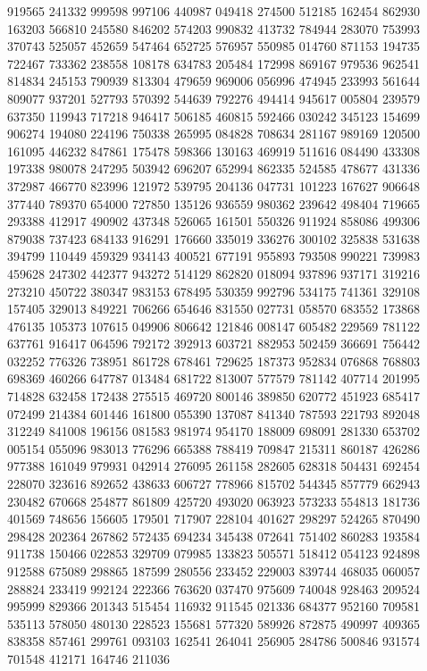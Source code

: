 {919565 241332 999598 997106 440987 049418 274500 512185 162454 862930 163203%
566810 245580 846202 574203 990832 413732 784944 283070 753993 370743 525057%
452659 547464 652725 576957 550985 014760 871153 194735 722467 733362 238558%
108178 634783 205484 172998 869167 979536 962541 814834 245153 790939 813304%
479659 969006 056996 474945 233993 561644 809077 937201 527793 570392 544639%
792276 494414 945617 005804 239579 637350 119943 717218 946417 506185 460815%
592466 030242 345123 154699 906274 194080 224196 750338 265995 084828 708634%
281167 989169 120500 161095 446232 847861 175478 598366 130163 469919 511616%
084490 433308 197338 980078 247295 503942 696207 652994 862335 524585 478677%
431336 372987 466770 823996 121972 539795 204136 047731 101223 167627 906648%
377440 789370 654000 727850 135126 936559 980362 239642 498404 719665 293388%
412917 490902 437348 526065 161501 550326 911924 858086 499306 879038 737423%
684133 916291 176660 335019 336276 300102 325838 531638 394799 110449 459329%
934143 400521 677191 955893 793508 990221 739983 459628 247302 442377 943272%
514129 862820 018094 937896 937171 319216 273210 450722 380347 983153 678495%
530359 992796 534175 741361 329108 157405 329013 849221 706266 654646 831550%
027731 058570 683552 173868 476135 105373 107615 049906 806642 121846 008147%
605482 229569 781122 637761 916417 064596 792172 392913 603721 882953 502459%
366691 756442 032252 776326 738951 861728 678461 729625 187373 952834 076868%
768803 698369 460266 647787 013484 681722 813007 577579 781142 407714 201995%
714828 632458 172438 275515 469720 800146 389850 620772 451923 685417 072499%
214384 601446 161800 055390 137087 841340 787593 221793 892048 312249 841008%
196156 081583 981974 954170 188009 698091 281330 653702 005154 055096 983013%
776296 665388 788419 709847 215311 860187 426286 977388 161049 979931 042914%
276095 261158 282605 628318 504431 692454 228070 323616 892652 438633 606727%
778966 815702 544345 857779 662943 230482 670668 254877 861809 425720 493020%
063923 573233 554813 181736 401569 748656 156605 179501 717907 228104 401627%
298297 524265 870490 298428 202364 267862 572435 694234 345438 072641 751402%
860283 193584 911738 150466 022853 329709 079985 133823 505571 518412 054123%
924898 912588 675089 298865 187599 280556 233452 229003 839744 468035 060057%
288824 233419 992124 222366 763620 037470 975609 740048 928463 209524 995999%
829366 201343 515454 116932 911545 021336 684377 952160 709581 535113 578050%
480130 228523 155681 577320 589926 872875 490997 409365 838358 857461 299761%
093103 162541 264041 256905 284786 500846 931574 701548 412171 164746 211036%
}
